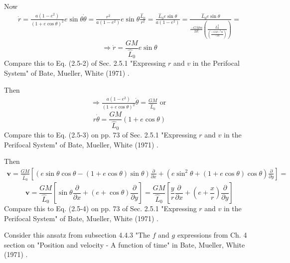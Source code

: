 \documentclass[10pt]{amsart}
\begin{document}
\begin{multicols*}{2}
Now
\[
\begin{gathered}
\dot{r} = \frac{ a ( 1 - e^2) }{ (1+ e\cos{\theta})^2 } e\sin{\theta} \dot{\theta} = \frac{r^2}{a (1-e^2) } e\sin{\theta} \frac{ \widehat{L}_0 }{ r^2} = \frac{ \widehat{L}_0 e\sin{\theta}}{ a(1-e^2)} = \frac{\widehat{L}_0 e\sin{\theta} }{ \frac{ -GMm}{2E} \left( \frac{ L_0^2}{ \left( \frac{(GM)^2 m }{ -2E} \right) } \right) } = 
\end{gathered}
\]
\begin{equation}
\Longrightarrow \dot{r} = \frac{GM}{\widehat{L}_0} e\sin{\theta}
\end{equation}
Compare this to Eq. (2.5-2) of Sec. 2.5.1 "Expressing $r$ and $v$ in the Perifocal System" of Bate, Mueller, White (1971) \cite{BMW1971}.

Then
\[
\begin{gathered}
	\Longrightarrow \frac{ a (1-e^2) }{ (1 + e\cos{\theta})^2 } \dot{\theta} = \frac{GM}{ \widehat{L}_0 } \text{ or } 
\end{gathered}
\]
\begin{equation}
r\dot{\theta} = \frac{GM}{\widehat{L}_0 } (1 + e\cos{\theta})
\end{equation}
Compare this to Eq. (2.5-3) on pp. 73 of Sec. 2.5.1 "Expressing $r$ and $v$ in the Perifocal System" of Bate, Mueller, White (1971) \cite{BMW1971}.

Then
\[
\begin{gathered}
\mathbf{v} = \frac{GM}{\widehat{L}_0} \left[ \left( e \sin{\theta} \cos{\theta} - (1 + e\cos{\theta}) \sin{\theta} \right) \frac{\partial }{ \partial x} + \left( e\sin^2{\theta} + (1 + e\cos{\theta} ) \cos{\theta} \right) \frac{\partial }{ \partial y} \right] = 
\end{gathered}
\]
\begin{equation}
\mathbf{v} = \frac{GM}{ \widehat{L}_0} \left[ \sin{\theta} \frac{\partial}{\partial x} + (e + \cos{\theta}) \frac{\partial }{\partial y} \right] = \frac{GM}{ \widehat{L}_0} \left[ \frac{y}{r} \frac{\partial}{\partial x} + (e + \frac{x}{r}) \frac{\partial }{\partial y} \right]
\end{equation}
Compare this to Eq. (2.5-4) on pp. 73 of Sec. 2.5.1 "Expressing $r$ and $v$ in the Perifocal System" of Bate, Mueller, White (1971) \cite{BMW1971}.

Consider this ansatz from subsection 4.4.3 "The $f$ and $g$ expressions from Ch. 4 section on "Position and velocity - A function of time" in Bate, Mueller, White (1971) \cite{BMW1971}. 


\end{multicols*}
\end{document}
